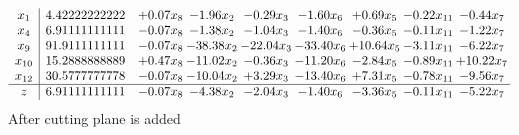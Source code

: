 \documentclass[8pt]{article}
\begin{document}
\[\begin{array}{c| c c@{\hskip 2pt} c@{\hskip 2pt} c@{\hskip 2pt} c@{\hskip 2pt} c@{\hskip 2pt} c@{\hskip 2pt} c@{\hskip 2pt} }
 x_{1}   &  4.42222222222 & +  0.07 x_{8} & -1.96 x_{2} & -0.29 x_{3} & -1.60 x_{6} & +  0.69 x_{5} & -0.22 x_{11} & -0.44 x_{7}\\
 x_{4}   &  6.91111111111 & -0.07 x_{8} & -1.38 x_{2} & -1.04 x_{3} & -1.40 x_{6} & -0.36 x_{5} & -0.11 x_{11} & -1.22 x_{7}\\
 x_{9}   &  91.9111111111 & -0.07 x_{8} & -38.38 x_{2} & -22.04 x_{3} & -33.40 x_{6} & + 10.64 x_{5} & -3.11 x_{11} & -6.22 x_{7}\\
 x_{10}   &  15.2888888889 & +  0.47 x_{8} & -11.02 x_{2} & -0.36 x_{3} & -11.20 x_{6} & -2.84 x_{5} & -0.89 x_{11} & + 10.22 x_{7}\\
 x_{12}   &  30.5777777778 & -0.07 x_{8} & -10.04 x_{2} & +  3.29 x_{3} & -13.40 x_{6} & +  7.31 x_{5} & -0.78 x_{11} & -9.56 x_{7}\\
\hline
z    &  6.91111111111 & -0.07 x_{8} & -4.38 x_{2} & -2.04 x_{3} & -1.40 x_{6} & -3.36 x_{5} & -0.11 x_{11} & -5.22 x_{7}\\
\end{array}\]
 After cutting plane is added 
\end{document}
